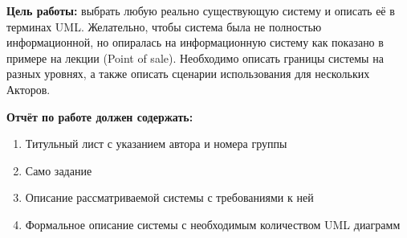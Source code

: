 \newpage

\textbf{Цель работы:}
выбрать любую реально существующую систему и описать её в терминах UML\@.
Желательно, чтобы система была не полностью информационной,
но опиралась на информационную систему как показано в примере на лекции (Point of sale).
Необходимо описать границы системы на разных уровнях, а также описать сценарии использования для нескольких Акторов.

\medskip

\textbf{Отчёт по работе должен содержать:}
\begin{enumerate}
    \item Титульный лист с указанием автора и номера группы
    \item Само задание
    \item Описание рассматриваемой системы с требованиями к ней
    \item Формальное описание системы с необходимым количеством UML диаграмм
\end{enumerate}
